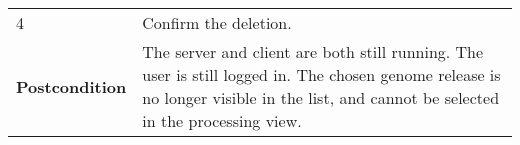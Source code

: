 \begin{longtable}[c]{@{}ll@{}}
\begin{minipage}[t]{0.31\columnwidth}\raggedright\strut
4
\strut\end{minipage} &
\begin{minipage}[t]{0.63\columnwidth}\raggedright\strut
Confirm the deletion.
\strut\end{minipage}\tabularnewline
\begin{minipage}[t]{0.31\columnwidth}\raggedright\strut
\textbf{Postcondition}
\strut\end{minipage} &
\begin{minipage}[t]{0.63\columnwidth}\raggedright\strut
The server and client are both still running. The user is still logged
in. The chosen genome release is no longer visible in the list, and
cannot be selected in the processing view.
\strut\end{minipage}\tabularnewline
\bottomrule
\end{longtable}

